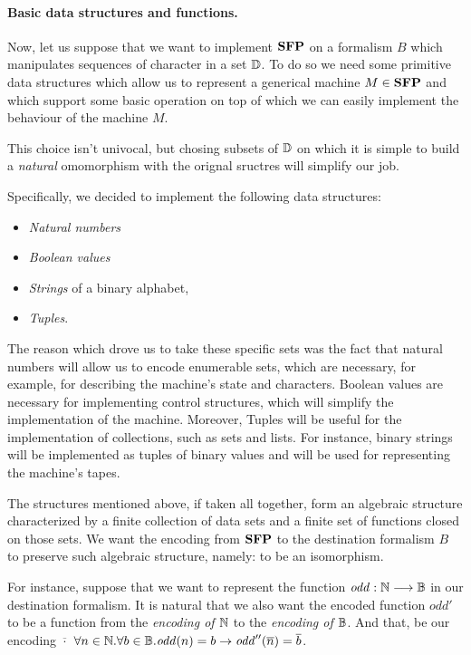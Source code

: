 \begin{conditional}{\appendixorsup}
  \paragraph{Basic data structures and functions.}
  Now, let us suppose that we want to implement $\mathbf{SFP}$ on a formalism
  $B$ which manipulates sequences of character in a set $\mathbb{D}$. To do so we
  need some primitive data structures which allow us to represent a generical
  machine $M \in \mathbf{SFP}$ and which support some basic operation on top of which
  we can easily implement the behaviour of the machine $M$.

  This choice isn't univocal, but chosing subsets of $\mathbb{D}$ on which it is simple to
  build a \emph{natural} omomorphism with the orignal sructres will simplify our job.

  Specifically, we decided to implement the following data structures:
  \begin{itemize}
  \itemsep0em
  \item
  \emph{Natural numbers}

  \item
  \emph{Boolean values}

  \item
  \emph{Strings} of a binary alphabet,

  \item
  \emph{Tuples}.
  \end{itemize}

  The reason which drove us to take these specific sets was the fact that
  natural numbers will allow us to encode enumerable sets, which are necessary,
  for example, for describing the machine's state and characters. Boolean values
  are necessary for implementing control structures, which will simplify
  the implementation of the machine. Moreover, Tuples will be useful for
  the implementation of collections, such as sets and lists. For instance,
  binary strings will be implemented as tuples of binary values and will be
  used for representing the machine's tapes.

  The structures mentioned above, if taken all together, form an algebraic
  structure characterized by a finite collection of data sets and a finite set
  of functions closed on those sets. We want the encoding from $\mathbf{SFP}$ to the
  destination formalism $B$ to preserve such algebraic structure, namely: to
  be an isomorphism.

  For instance, suppose that we want to
  represent the function $\mathit{odd}: \mathbb{N} \longrightarrow \mathbb{B}$
  in our destination formalism. It is natural that we also want the encoded
  function $\mathit{odd'}$ to be a function from the \emph{encoding of $\mathbb{N}$} to
  the \emph{encoding of $\mathbb{B}$}. And that, be our encoding $\overline \cdot$
  $\forall n \in \mathbb{N}.\forall b \in \mathbb{B}. \mathit{odd}(n)=b\to
  \mathit{odd}''(\overline n)=\overline b$.


\end{conditional}
